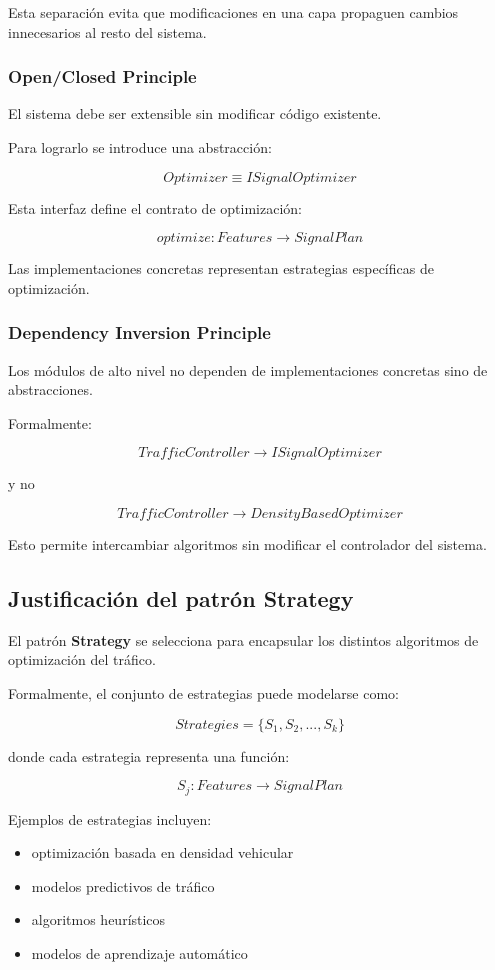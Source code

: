 \documentclass[12pt]{article}
\begin{document}
Esta separación evita que modificaciones en una capa propaguen cambios innecesarios al resto del sistema.

\subsubsection{Open/Closed Principle}

El sistema debe ser extensible sin modificar código existente.

Para lograrlo se introduce una abstracción:

\[
Optimizer \equiv ISignalOptimizer
\]

Esta interfaz define el contrato de optimización:

\[
optimize : Features \rightarrow SignalPlan
\]

Las implementaciones concretas representan estrategias específicas de optimización.

\subsubsection{Dependency Inversion Principle}

Los módulos de alto nivel no dependen de implementaciones concretas sino de abstracciones.

Formalmente:

\[
TrafficController \rightarrow ISignalOptimizer
\]

y no

\[
TrafficController \rightarrow DensityBasedOptimizer
\]

Esto permite intercambiar algoritmos sin modificar el controlador del sistema.

\subsection{Justificación del patrón Strategy}

El patrón \textbf{Strategy} se selecciona para encapsular los distintos algoritmos de optimización del tráfico.

Formalmente, el conjunto de estrategias puede modelarse como:

\[
Strategies = \{S_1, S_2, ..., S_k\}
\]

donde cada estrategia representa una función:

\[
S_j : Features \rightarrow SignalPlan
\]

Ejemplos de estrategias incluyen:

\begin{itemize}

\item optimización basada en densidad vehicular
\item modelos predictivos de tráfico
\item algoritmos heurísticos
\item modelos de aprendizaje automático

\end{itemize}
\end{document}
